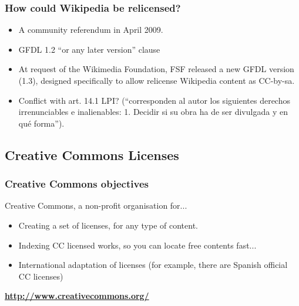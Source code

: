 
\begin{frame}
\frametitle {How could Wikipedia be relicensed?}

\pause

\begin{itemize}
\item A community referendum in April 2009.
\item GFDL 1.2 ``\alert{or} any later version'' clause
\item At request of the Wikimedia Foundation, FSF released a new GFDL version (1.3), designed
specifically to allow relicense Wikipedia content as CC-by-sa.
\item Conflict with art. 14.1 LPI? (``corresponden al autor los siguientes derechos irrenunciables e \alert{inalienables}: 1. Decidir si su obra ha de ser divulgada y en qué forma'').
\end{itemize}

\end{frame}

\subsection{Creative Commons Licenses}




\begin{frame}
\frametitle{Creative Commons objectives}

Creative Commons, a non-profit organisation for...

\begin{itemize}
\item Creating a set of licenses, for any type of content.
\item Indexing CC licensed works, so you can locate free contents fast...
\item International adaptation of licenses (for example, there are
  Spanish official CC licenses)
\end{itemize}
\vspace{1cm}
\begin{center}
{\LARGE
\textbf{\url{http://www.creativecommons.org/}}
}
\end{center}

\end{frame}


